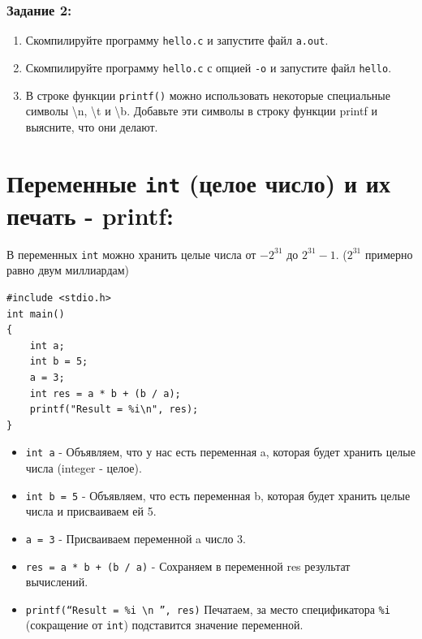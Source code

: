 \documentclass{article}
\begin{document}
\subsubsection*{Задание 2:}
\begin{enumerate}
\item Скомпилируйте программу \texttt{hello.c} и запустите файл \texttt{a.out}.
\item Скомпилируйте программу \texttt{hello.c} с опцией \texttt{-o} и запустите файл \texttt{hello}.
\item В строке функции \texttt{printf()} можно использовать некоторые специальные символы \textbackslash n, \textbackslash t и \textbackslash b. Добавьте эти символы в строку функции printf и выясните, что они делают.
\end{enumerate}

\section*{Переменные \texttt{int} (целое число) и их печать - printf:}
В переменных \texttt{int} можно хранить целые числа от $-2^{31}$ до $2^{31} - 1$. ($2^{31}$ примерно равно двум миллиардам)
\begin{lstlisting}
#include <stdio.h>
int main() 
{
    int a;
    int b = 5;
    a = 3;
    int res = a * b + (b / a);
    printf("Result = %i\n", res);
}
\end{lstlisting}

\begin{itemize}
\item \texttt{int a} - Объявляем, что у нас есть переменная a, которая будет хранить целые числа (integer - целое).
\item \texttt{int b = 5} - Объявляем, что есть переменная b, которая будет хранить целые числа и присваиваем ей 5.
\item \texttt{a = 3} - Присваиваем переменной a число 3.
\item \texttt{res = a * b + (b / a)} - Сохраняем в переменной res результат вычислений.
\item \texttt{printf(``Result = \%i \textbackslash n '', res)} Печатаем, за место спецификатора \texttt{\%i} (сокращение от \texttt{int}) подставится значение переменной.
\end{itemize}
\end{document}
